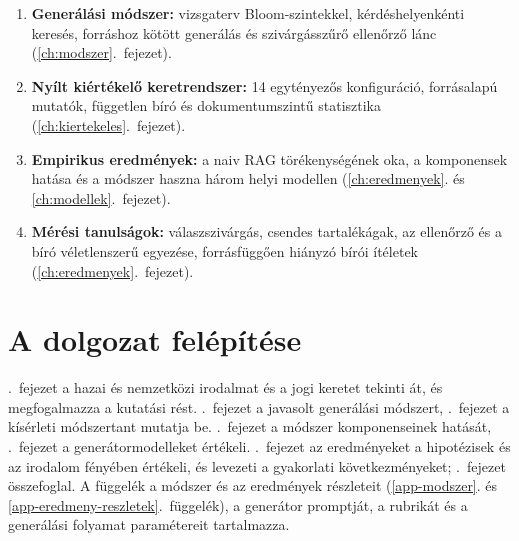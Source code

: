 \begin{enumerate}[label=(\arabic*),itemsep=0pt]
\item \textbf{Generálási módszer:} vizsgaterv Bloom-szintekkel, kérdéshelyenkénti keresés, forráshoz kötött
generálás és szivárgásszűrő ellenőrző lánc (\ref{ch:modszer}.~fejezet).
\item \textbf{Nyílt kiértékelő keretrendszer:} 14 egytényezős konfiguráció, forrásalapú mutatók, független bíró
és dokumentumszintű statisztika (\ref{ch:kiertekeles}.~fejezet).
\item \textbf{Empirikus eredmények:} a naiv RAG törékenységének oka, a komponensek hatása és a módszer
haszna három helyi modellen (\ref{ch:eredmenyek}. és \ref{ch:modellek}.~fejezet).
\item \textbf{Mérési tanulságok:} válaszszivárgás, csendes tartalékágak, az ellenőrző és a bíró
véletlenszerű egyezése, forrásfüggően hiányzó bírói ítéletek (\ref{ch:eredmenyek}.~fejezet).
\end{enumerate}

\section{A dolgozat felépítése}

\Az{\ref{ch:szakirodalom}}.~fejezet a hazai és nemzetközi irodalmat és a jogi keretet tekinti át, és
megfogalmazza a kutatási rést. \Az{\ref{ch:modszer}}.~fejezet a javasolt generálási módszert,
\az{\ref{ch:kiertekeles}}.~fejezet a kísérleti módszertant mutatja be. \Az{\ref{ch:eredmenyek}}.~fejezet a
módszer komponenseinek hatását, \az{\ref{ch:modellek}}.~fejezet a generátormodelleket értékeli.
\Az{\ref{ch:diszkusszio}}.~fejezet az eredményeket a hipotézisek és az irodalom fényében értékeli, és levezeti a
gyakorlati következményeket; \az{\ref{ch:osszefoglalas}}.~fejezet összefoglal. A függelék a módszer és az
eredmények részleteit (\ref{app-modszer}. és \ref{app-eredmeny-reszletek}.~függelék), a generátor
promptját, a rubrikát és a generálási folyamat paramétereit tartalmazza.
